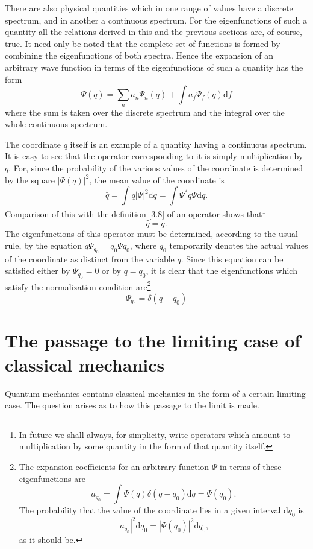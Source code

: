 There are also physical quantities which in one range of values have a discrete spectrum, and in another a continuous spectrum. For the eigenfunctions of such a quantity all the relations derived in this and the previous sections are, of course, true. It need only be noted that the complete set of functions is formed by combining the eigenfunctions of both spectra. Hence the expansion of an arbitrary wave function in terms of the eigenfunctions of such a quantity has the form
\begin{equation}\label{5.15}
\Psi(q)=\sum_{n}a_n\Psi_n(q)+\int a_f\Psi_f(q)\mathrm{d}f
\end{equation}	
where the sum is taken over the discrete spectrum and the integral over the whole continuous spectrum.
	
The coordinate $ q $ itself is an example of a quantity having a continuous spectrum. It is easy to see that the operator corresponding to it is simply multiplication by $ q $. For, since the probability of the various values of the coordinate is determined by the square $ |\Psi(q)|^2 $, the mean value of the coordinate is
\[ \bar{q}=\int q|\Psi|^2\mathrm{d}q=\int\Psi^*q\Psi\mathrm{d}q. \]	
Comparison of this with the definition \eqref{3.8} of an operator shows that\footnote{In future we shall always, for simplicity, write operators which amount to multiplication by some quantity in the form of that quantity itself.
}
\begin{equation}\label{5.16}
\hat{q}=q.
\end{equation}	
The eigenfunctions of this operator must be determined, according to the usual rule, by the equation $ q\Psi_{q_0} = q_0\Psi{q_0} $, where $ q_0 $ temporarily denotes the actual values of the coordinate as distinct from the variable $ q $. Since this equation can be satisfied either by $ \Psi_{q_0} = 0 $ or by $ q = q_0 $, it is clear that the eigenfunctions which satisfy the normalization condition are\footnote{The expansion coefficients for an arbitrary function $ \Psi $ in terms of these eigenfunctions are
\[ a_{q_0}=\int\Psi(q)\delta(q-q_0)\mathrm{d}q=\Psi(q_0). \]	
The probability that the value of the coordinate lies in a given interval $ \mathrm{d}q_0 $ is
\[ |a_{q_0}|^2\mathrm{d}q_0=|\Psi(q_0)|^2\mathrm{d}q_0, \]	
as it should be.
}
\begin{equation}\label{5.17}
\Psi_{q_0}=\delta(q-q_0)
\end{equation}
\section{The passage to the limiting case of classical mechanics}\label{The passage to the limiting case of classical mechanics}	
Quantum mechanics contains classical mechanics in the form of a certain limiting case. The question arises as to how this passage to the limit is made.
	
